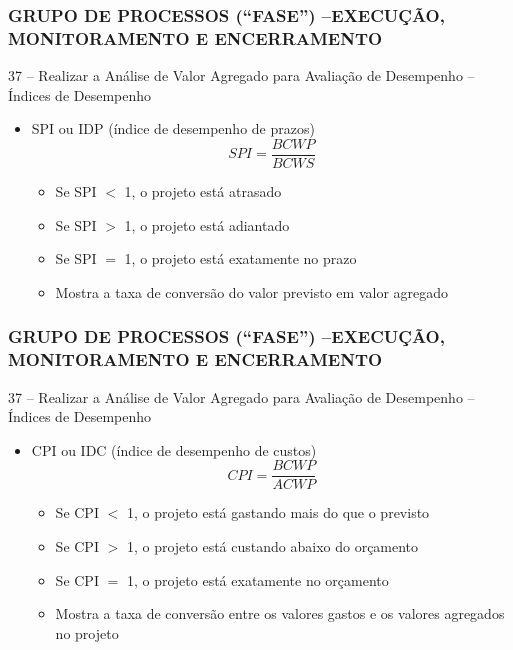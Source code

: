 \begin{frame}
 \frametitle{GRUPO DE PROCESSOS (“FASE”) –\small{EXECUÇÃO, MONITORAMENTO E ENCERRAMENTO}}
37 – Realizar a Análise de Valor Agregado para Avaliação de Desempenho – Índices de Desempenho
\begin{itemize}
 \item SPI ou IDP (índice de desempenho de prazos)
 \begin{equation}
  SPI = \frac{BCWP}{BCWS}
 \end{equation}
 \begin{itemize}
  \item Se SPI $<$ 1, o projeto está atrasado
  \item Se SPI $>$ 1, o projeto está adiantado
  \item Se SPI $=$ 1, o projeto está exatamente no prazo
  \item Mostra a taxa de conversão do valor previsto em valor agregado
 \end{itemize}
 \end{itemize}
\end{frame}

\begin{frame}
 \frametitle{GRUPO DE PROCESSOS (“FASE”) –\small{EXECUÇÃO, MONITORAMENTO E ENCERRAMENTO}}
37 – Realizar a Análise de Valor Agregado para Avaliação de Desempenho – Índices de Desempenho
\begin{itemize}
 \item CPI ou IDC (índice de desempenho de custos)
 \begin{equation}
  CPI = \frac{BCWP}{ACWP}
 \end{equation}
 \begin{itemize}
  \item Se CPI $<$ 1, o projeto está gastando mais do que o previsto
  \item Se CPI $>$ 1, o projeto está custando abaixo do orçamento
  \item Se CPI $=$ 1, o projeto está exatamente no orçamento
  \item Mostra a taxa de conversão entre os valores gastos e os valores agregados no projeto
 \end{itemize}
 \end{itemize}
\end{frame}

